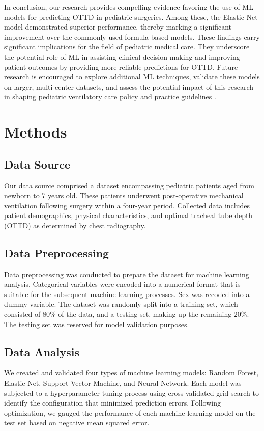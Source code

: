 \documentclass[11pt]{article}
\begin{document}
In conclusion, our research provides compelling evidence favoring the use of ML models for predicting OTTD in pediatric surgeries. Among these, the Elastic Net model demonstrated superior performance, thereby marking a significant improvement over the commonly used formula-based models. These findings carry significant implications for the field of pediatric medical care. They underscore the potential role of ML in assisting clinical decision-making and improving patient outcomes by providing more reliable predictions for OTTD. Future research is encouraged to explore additional ML techniques, validate these models on larger, multi-center datasets, and assess the potential impact of this research in shaping pediatric ventilatory care policy and practice guidelines \cite{Marco2011DataMM}.

\section*{Methods}

\subsection*{Data Source}
Our data source comprised a dataset encompassing pediatric patients aged from newborn to 7 years old. These patients underwent post-operative mechanical ventilation following surgery within a four-year period. Collected data includes patient demographics, physical characteristics, and optimal tracheal tube depth (OTTD) as determined by chest radiography.

\subsection*{Data Preprocessing}
Data preprocessing was conducted to prepare the dataset for machine learning analysis. Categorical variables were encoded into a numerical format that is suitable for the subsequent machine learning processes. Sex was recoded into a dummy variable. The dataset was randomly split into a training set, which consisted of 80\% of the data, and a testing set, making up the remaining 20\%. The testing set was reserved for model validation purposes.

\subsection*{Data Analysis}
We created and validated four types of machine learning models: Random Forest, Elastic Net, Support Vector Machine, and Neural Network. Each model was subjected to a hyperparameter tuning process using cross-validated grid search to identify the configuration that minimized prediction errors. Following optimization, we gauged the performance of each machine learning model on the test set based on negative mean squared error.
\end{document}
